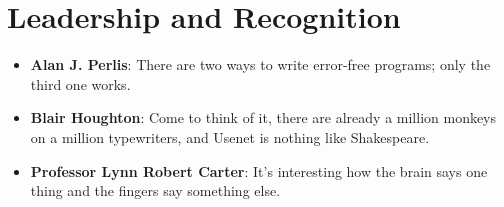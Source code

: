 \documentclass[letterpaper,10pt]{article}
\newcommand{\resumeItem}[2]{
  \item\small{
    \textbf{#1}{: #2 \vspace{-2pt}}
  }
}
\newcommand{\resumeSubItem}[2]{\resumeItem{#1}{#2}\vspace{-4pt}}
\newcommand{\resumeSubHeadingListStart}{\begin{itemize}[leftmargin=*]}
\newcommand{\resumeSubHeadingListEnd}{\end{itemize}}
\begin{document}
\section{Leadership and Recognition}
\resumeSubHeadingListStart
  \resumeSubItem{Alan J. Perlis}{There are two ways to write error-free programs; only the third one works.}
  \resumeSubItem{Blair Houghton}{Come to think of it, there are already a million monkeys on a million typewriters, and Usenet is nothing like Shakespeare.}
  \resumeSubItem{Professor Lynn Robert Carter}{It's interesting how the brain says one thing and the fingers say something else.}
\resumeSubHeadingListEnd
\end{document}
